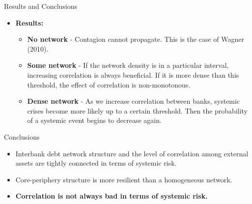 \documentclass{beamer}
\begin{document}
\begin{frame}{Results and Conclusions}
\begin{itemize}
	\item \textbf{Results:}
	\begin{itemize}
		\item \textbf{No network} - Contagion cannot propagate. This is 	the case of Wagner (2010).
		\item \textbf{Some network} - If the network density is in a 	particular interval, increasing correlation is always beneficial. If it is more dense than this threshold, the effect of correlation is non-monotonous.
		\item \textbf{Dense network} - As we increase correlation between 	banks, systemic crises become more likely up to a certain threshold. Then the probability of a systemic event begins to decrease again.
	\end{itemize}
\end{itemize}
\end{frame}

\begin{frame}{Conclusions}
\begin{itemize}
	\item Interbank debt network structure and the level of correlation among external assets are tightly connected in terms of systemic risk.
	\item Core-periphery structure is more resilient than a homogeneous network.
	\item \textbf{Correlation is not always bad in terms of systemic risk.}
\end{itemize}
\end{frame}



%   
\end{document}
